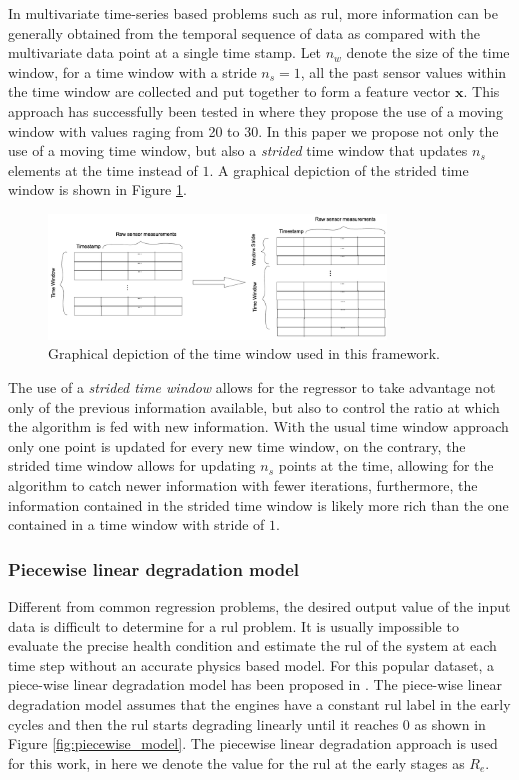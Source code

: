 In multivariate time-series based problems such as \gls{rul}, more information can be generally obtained from the temporal sequence of data as compared with the multivariate data point at a single time stamp. Let $n_w$ denote the size of the time window, for a time window with a stride $n_s = 1$, all the past sensor values within the time window are collected and put together to form a feature vector $\mathbf{x}$. This approach has successfully been tested in \cite{Li2018, Lim2016} where they propose the use of a moving window with values raging from 20 to 30. In this paper we propose not only the use of a moving time window, but also a \textit{strided} time window that updates $n_s$ elements at the time instead of $1$. A graphical depiction of the strided time window is shown in Figure \ref{fig:time_window}.

\begin{figure}[!htb]
\centering
\includegraphics[width=0.8\textwidth]{img/time_window.png}
\caption{Graphical depiction of the time window used in this framework.}
\label{fig:time_window}
\end{figure}

The use of a \textit{strided time window} allows for the regressor to take advantage not only of the previous information available, but also to control the ratio at which the algorithm is fed with new information. With the usual time window approach only one point is updated for every new time window, on the contrary, the strided time window allows for updating $n_s$ points at the time, allowing for the algorithm to catch newer information with fewer iterations, furthermore, the information contained in the strided time window is likely more rich than the one contained in a time window with stride of $1$.

\subsubsection{Piecewise linear degradation model}

Different from common regression problems, the desired output value of the input data is difficult to determine for a \gls{rul} problem. It is usually impossible to evaluate the precise health condition and estimate the \gls{rul} of the system at each time step without an accurate physics based model. For this popular dataset, a piece-wise linear degradation model has been proposed in \cite{Ramasso2014}. The piece-wise linear degradation model assumes that the engines have a constant \gls{rul} label in the early cycles and then the \gls{rul} starts degrading linearly until it reaches 0 as shown in Figure \ref{fig:piecewise_model}. The piecewise linear degradation approach is used for this work, in here we denote the value for the \gls{rul} at the early stages as $R_e$. 

